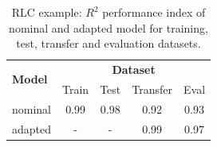 \documentclass{article}
\begin{document}
\begin{table}[!tb]
\centering
\begin{tabular}{l | c  c  c  c}
\multirow{2}{*}{\textbf{Model}} & \multicolumn{4}{c}{\textbf{Dataset}} \\
                & Train      & Test       & Transfer & Eval       \\ %
\hline
nominal         & 0.99       & 0.98       & 0.92     & 0.93 \\
adapted         & -          & -          & 0.99     & 0.97  \\
\hline
\end{tabular}
\caption{RLC example: $R^2$  performance index  of  nominal and adapted model for training, test, transfer and evaluation datasets.}
\label{tab:RLC_performance}
\end{table}
\end{document}
